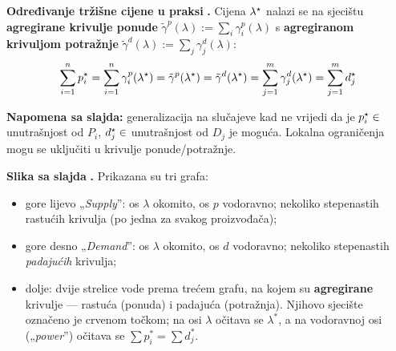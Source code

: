 \textbf{Određivanje tržišne cijene u praksi} \textbf{.} Cijena
$\lambda^{\star}$ nalazi se na sjecištu \textbf{agregirane krivulje ponude}
$\tilde\gamma^p(\lambda) := \sum_i\gamma_i^p(\lambda)$ s \textbf{agregiranom
krivuljom potražnje} $\tilde\gamma^d(\lambda) := \sum_j\gamma_j^d(\lambda)$:
\[
\sum_{i=1}^{n}p_i^{\star} = \sum_{i=1}^{n}\gamma_i^p(\lambda^{\star})
= \tilde\gamma^p(\lambda^{\star}) = \tilde\gamma^d(\lambda^{\star})
= \sum_{j=1}^{m}\gamma_j^d(\lambda^{\star}) = \sum_{j=1}^{m}d_j^{\star}
\]

\textbf{Napomena sa slajda:} generalizacija na slučajeve kad ne vrijedi da je
$p_i^{\star} \in$ unutrašnjost od $P_i$, $d_j^{\star} \in$ unutrašnjost od $D_j$ je
moguća. Lokalna ograničenja mogu se uključiti u krivulje ponude/potražnje.

\textbf{Slika sa slajda} \textbf{.} Prikazana su tri grafa:

\begin{itemize}
  \item gore lijevo „\emph{Supply}”: os $\lambda$ okomito, os $p$ vodoravno;
        nekoliko stepenastih rastućih krivulja (po jedna za svakog
        proizvođača);
  \item gore desno „\emph{Demand}”: os $\lambda$ okomito, os $d$ vodoravno;
        nekoliko stepenastih \emph{padajućih} krivulja;
  \item dolje: dvije strelice vode prema trećem grafu, na kojem su
        \textbf{agregirane} krivulje --- rastuća (ponuda) i padajuća
        (potražnja). Njihovo sjecište označeno je crvenom točkom; na osi
        $\lambda$ očitava se $\lambda^{*}$, a na vodoravnoj osi („\emph{power}”)
        očitava se $\sum p_i^{*} = \sum d_j^{*}$.
\end{itemize}

